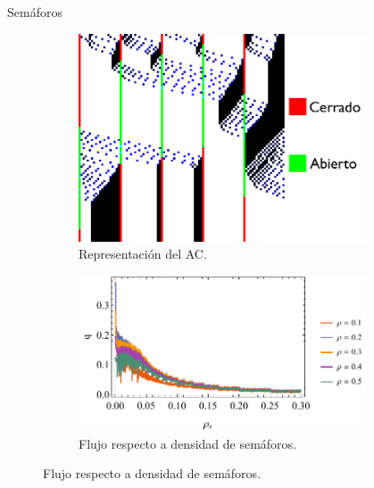 \documentclass[final]{beamer}
\newlength{\onecolwid}
\newlength{\twocolwid}
\begin{document}
\begin{frame}[t]
\begin{columns}[t]
\begin{column}{\twocolwid}
\begin{columns}[t,totalwidth=\twocolwid]
\begin{column}{\onecolwid}
\begin{block}{Semáforos}
\begin{figure}[h!]
\begin{subfigure}{.5\textwidth}
	\centering
	\includegraphics[scale=0.4]{img/semaforo_ac}
	\caption{Representación del AC.}
\end{subfigure}%
\begin{subfigure}{.5\textwidth}
	\centering
	\includegraphics[scale=1.2]{img/flow_vs_semaphore_density}
	\caption{Flujo respecto a densidad de semáforos.}
\end{subfigure}%
\end{figure}

\end{block}


\end{column} %

\begin{column}{\onecolwid}\vspace{-.6in} %


\end{column}
\end{columns}
\end{column}
\end{columns}
\end{frame}
\end{document}
